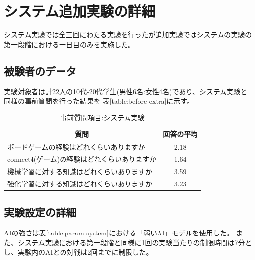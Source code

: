 \chapter{システム追加実験の詳細}
\label{chap:system}
システム実験では全三回にわたる実験を行ったが追加実験ではシステムの実験の第一段階における一日目のみを実施した。
\section{被験者のデータ}
実験対象者は計22人の10代-20代学生(男性6名:女性4名)であり、システム実験と同様の事前質問を行った結果を
表\ref{table:before-extra}に示す。


\begin{table}[H]
    \caption{事前質問項目:システム実験}
    \label{table:before}
	\scriptsize
    \begin{tabular}{l||c}
        \multicolumn{1}{c|}{質問} & 回答の平均\\ \hline \hline
        ボードゲームの経験はどれくらいありますか & 2.18\\
        connect4(ゲーム)の経験はどれくらいありますか& 1.64\\\hline
        機械学習に対する知識はどれくらいありますか& 3.59\\
        強化学習に対する知識はどれくらいありますか& 3.23\\
    \end{tabular}
    
\end{table}
\section{実験設定の詳細}
AIの強さは表\ref{table:param-system}における「弱いAI」モデルを使用した。
また、システム実験における第一段階と同様に1回の実験当たりの制限時間は7分とし、実験内のAIとの対戦は2回までに制限した。

